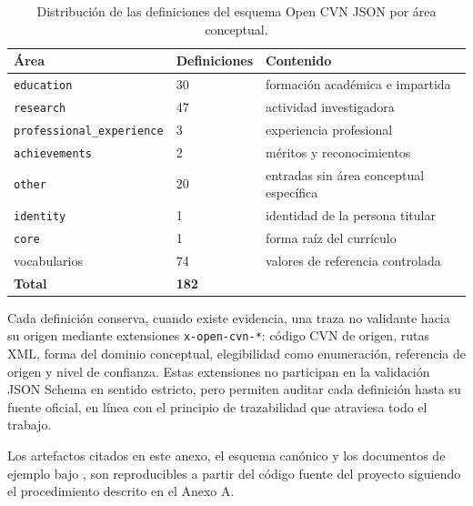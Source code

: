 \begin{table}[htbp]
  \centering
  \footnotesize
  \renewcommand{\arraystretch}{1.45}
  \caption{Distribución de las definiciones del esquema Open CVN JSON por área conceptual.}
  \label{tab:anexo_formato_defs}
  \begin{tabular}{p{} p{} p{}}
    \hline
    \textbf{Área} & \textbf{Definiciones} & \textbf{Contenido} \\
    \hline
    \texttt{education} & 30 & formación académica e impartida \\
    \texttt{research} & 47 & actividad investigadora \\
    \texttt{professional\_experience} & 3 & experiencia profesional \\
    \texttt{achievements} & 2 & méritos y reconocimientos \\
    \texttt{other} & 20 & entradas sin área conceptual específica \\
    \texttt{identity} & 1 & identidad de la persona titular \\
    \texttt{core} & 1 & forma raíz del currículo \\
    vocabularios & 74 & valores de referencia controlada \\
    \hline
    \textbf{Total} & \textbf{182} & \\
    \hline
  \end{tabular}
\end{table}

Cada definición conserva, cuando existe evidencia, una traza no validante
hacia su origen mediante extensiones \texttt{x-open-cvn-*}: código CVN de
origen, rutas XML, forma del dominio conceptual, elegibilidad como
enumeración, referencia de origen y nivel de confianza. Estas extensiones
no participan en la validación JSON Schema en sentido estricto, pero
permiten auditar cada definición hasta su fuente oficial, en línea con el
principio de trazabilidad que atraviesa todo el trabajo.

Los artefactos citados en este anexo, el esquema canónico
 y los documentos de ejemplo bajo
, son reproducibles a partir del código fuente
del proyecto siguiendo el procedimiento descrito en el Anexo A.
